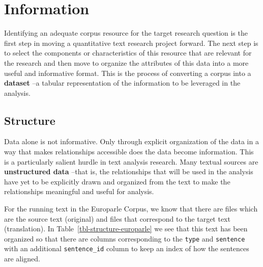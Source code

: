 \documentclass[
  letterpaper,
]{latex/krantz}
\begin{document}
\hypertarget{information}{%
\section{Information}\label{information}}

Identifying an adequate corpus resource for the target research question
is the first step in moving a quantitative text research project
forward. The next step is to select the components or characteristics of
this resource that are relevant for the research and then move to
organize the attributes of this data into a more useful and informative
format. This is the process of converting a corpus into a
\textbf{dataset} --a tabular representation of the
information to be leveraged in the analysis.

\hypertarget{structure-1}{%
\subsection{Structure}\label{structure-1}}

Data alone is not informative. Only through explicit organization of the
data in a way that makes relationships accessible does the data become
information. This is a particularly salient hurdle in text analysis
research. Many textual sources are
\textbf{unstructured data} --that is, the
relationships that will be used in the analysis have yet to be
explicitly drawn and organized from the text to make the relationships
meaningful and useful for analysis.

For the running text in the Europarle Corpus, we know that there are
files which are the source text (original) and files that correspond to
the target text (translation). In Table~\ref{tbl-structure-europarle} we
see that this text has been organized so that there are columns
corresponding to the \texttt{type} and \texttt{sentence} with an
additional \texttt{sentence\_id} column to keep an index of how the
sentences are aligned.
\end{document}
